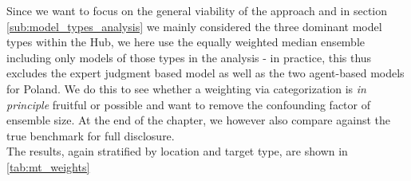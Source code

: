 Since we want to focus on the general viability of the approach and in section \ref{sub:model_types_analysis} we mainly considered the three dominant model types within the Hub, we here use the equally weighted median ensemble including only models of those types in the analysis - in practice, this thus excludes the expert judgment based model as well as the two agent-based models for Poland. We do this to see whether a weighting via categorization is \textit{in principle} fruitful or possible and want to remove the confounding factor of ensemble size. At the end of the chapter, we however also compare against the true benchmark for full disclosure. \\ 
The results, again stratified by location and target type, are shown in \ref{tab:mt_weights}
